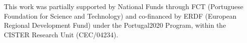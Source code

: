 This work was partially supported by National Funds through FCT (Portuguese Foundation for Science and Technology) and co-financed by ERDF (European Regional Development Fund) under the Portugal2020 Program, within the CISTER Research Unit (CEC/04234).